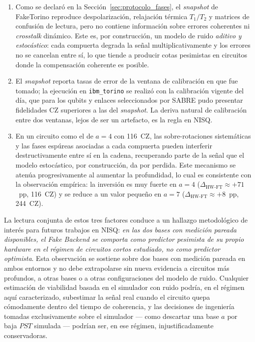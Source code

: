 \documentclass[12pt, spanish]{book}
\begin{document}
\begin{enumerate}
    \item Como se declaró en la Sección~\ref{sec:protocolo_fases}, el \textit{snapshot} de FakeTorino reproduce despolarización, relajación térmica $T_1/T_2$ y matrices de confusión de lectura, pero no contiene información sobre errores coherentes ni \textit{crosstalk} dinámico. Este es, por construcción, un modelo de ruido \emph{aditivo y estocástico}: cada compuerta degrada la señal multiplicativamente y los errores no se cancelan entre sí, lo que tiende a producir cotas pesimistas en circuitos donde la compensación coherente es posible.
    \item El \textit{snapshot} reporta tasas de error de la ventana de calibración en que fue tomado; la ejecución en \texttt{ibm\_torino} se realizó con la calibración vigente del día, que para los qubits y enlaces seleccionados por SABRE pudo presentar fidelidades CZ superiores a las del \textit{snapshot}. La deriva natural de calibración entre dos ventanas, lejos de ser un artefacto, es la regla en NISQ.
    \item En un circuito como el de $a = 4$ con 116~CZ, las sobre-rotaciones sistemáticas y las fases espúreas asociadas a cada compuerta pueden interferir destructivamente entre sí en la cadena, recuperando parte de la señal que el modelo estocástico, por construcción, da por perdida. Este mecanismo se atenúa progresivamente al aumentar la profundidad, lo cual es consistente con la observación empírica: la inversión es muy fuerte en $a = 4$ ($\Delta_{\text{HW-FT}} \approx +71$~pp, 116~CZ) y se reduce a un valor pequeño en $a = 7$ ($\Delta_{\text{HW-FT}} \approx +8$~pp, 244~CZ).
\end{enumerate}

La lectura conjunta de estos tres factores conduce a un hallazgo metodológico de interés para futuros trabajos en NISQ: \emph{en las dos bases con medición pareada disponibles, el \textit{Fake Backend} se comporta como predictor pesimista de su propio hardware en el régimen de circuitos cortos estudiado, no como predictor optimista}. Esta observación se sostiene sobre dos bases con medición pareada en ambos entornos y no debe extrapolarse sin nueva evidencia a circuitos más profundos, a otras bases o a otras configuraciones del modelo de ruido. Cualquier estimación de viabilidad basada en el simulador con ruido podría, en el régimen aquí caracterizado, subestimar la señal real cuando el circuito quepa cómodamente dentro del tiempo de coherencia, y las decisiones de ingeniería tomadas exclusivamente sobre el simulador --- como descartar una base $a$ por baja $PST$ simulada --- podrían ser, en ese régimen, injustificadamente conservadoras.\\
\end{document}
